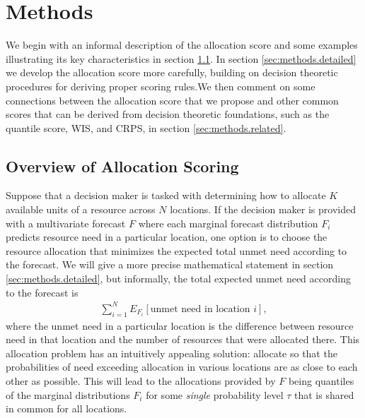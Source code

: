 \documentclass{article}
\begin{document}
\section{Methods}
\label{sec:methods}

We begin with an informal description of the allocation score and some examples illustrating its key characteristics in section \ref{sec:methods.overview}. In section \ref{sec:methods.detailed} we develop the allocation score more carefully, building on decision theoretic procedures for deriving proper scoring rules.We then comment on some connections between the allocation score that we propose and other common scores that can be derived from decision theoretic foundations, such as the quantile score, WIS, and CRPS, in section \ref{sec:methods.related}.

\subsection{Overview of Allocation Scoring}
\label{sec:methods.overview}

Suppose that a decision maker is tasked with determining how to allocate $K$ available units of a resource across $N$ locations.
If the decision maker is provided with a multivariate forecast $F$ where each marginal forecast distribution $F_i$ predicts resource need in a particular location, one option is to choose the resource allocation that minimizes the expected total unmet need according to the forecast.
We will give a more precise mathematical statement in section \ref{sec:methods.detailed}, but informally, the total expected unmet need according to the forecast is
\begin{align}
\sum_{i=1}^N E_{F_i}[\text{unmet need in location $i$}], \label{eqn:informal_objective}
\end{align}
where the unmet need in a particular location is the difference between resource need in that location and the number of resources that were allocated there.
This allocation problem has an intuitively appealing solution: allocate so that the probabilities of need exceeding allocation in various locations are as close to each other as possible.
This will lead to the allocations provided by $F$ being quantiles of the marginal distributions $F_i$ for some \emph{single} probability level $\tau$ that is shared in common for all locations.
\end{document}
